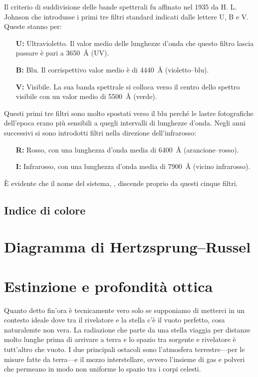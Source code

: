         Il criterio di suddivisione delle bande spettrrali fu affinato nel 1935 da H. L. Johnson che introdusse i primi tre filtri standard indicati dalle lettere U, B e V. Queste stanno per:
        \begin{enumerate}
            \item[\textbf{U:}] Ultravioletto. Il valor medio delle lunghezze d'onda che questo filtro lascia passare è pari a \SI{3650}{\angstrom} (UV).
            \item[\textbf{B:}] Blu. Il corrispettivo valor medio è di \SI{4440}{\angstrom} (violetto--blu).
            \item[\textbf{V:}] Visibile. La sua banda spettrale si colloca verso il centro dello spettro visibile con un valor medio di \SI{5500}{\angstrom} (verde).
        \end{enumerate}
        Questi primi tre filtri sono molto spostati verso il blu perché le lastre fotografiche dell'epoca erano più sensibili a quegli intervalli di lunghezze d'onda. Negli anni successivi si sono introdotti filtri nella direzione dell'infrarosso:
        \begin{enumerate}
            \item[\textbf{R:}] Rosso, con una lunghezza d'onda media di \SI{6400}{\angstrom} (arancione--rosso).
            \item[\textbf{I:}] Infrarosso, con una lunghezza d'onda media di \SI{7900}{\angstrom} (vicino infrarosso).
        \end{enumerate}
        È evidente che il nome del sistema, \emph{\ubvri}, discende proprio da questi cinque filtri.
    \subsection{Indice di colore}
\section{Diagramma di Hertzsprung--Russel}
\section{Estinzione e profondità ottica}
    Quanto detto fin'ora è tecnicamente vero solo se supponiamo di metterci in un contesto ideale dove tra il rivelatore e la stella c'è il vuoto perfetto, cosa naturalemte non vera. La radiazione che parte da una stella viaggia per distanze molto lunghe prima di arrivare a terra e lo spazio tra sorgente e rivelatore è tutt'altro che vuoto. I due principali ostacoli sono l'atmosfera terrestre---per le misure fatte da terra---e il mezzo interstellare, ovvero l'insieme di gas e polveri che permeano in modo non uniforme lo spazio tra i corpi celesti.

